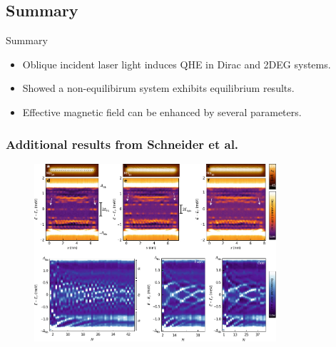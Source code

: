 \documentclass[xcolor=dvipsnames,10pt,aspectratio=169]{beamer}
\newcommand{\CO}{Summary}
\begin{document}
  \subsection{\CO}

  \begin{frame}{\CO}
    \begin{itemize}
      \item Oblique incident laser light induces QHE in Dirac and 2DEG systems.
      \item Showed a non-equilibirum system exhibits equilibrium  results.
      \item Effective magnetic field can be enhanced by several parameters.
    \end{itemize}
  \end{frame}

  \appendix

  \begin{frame}
    \frametitle{Additional results from Schneider et al.}

    \begin{figure}
      \includegraphics[width=0.8\textwidth]{./figures/Schneider-additional-results.pdf}
    \end{figure}

  \end{frame}
\end{document}
